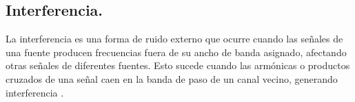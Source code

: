 \subsection*{\fontsize{12}{18}\selectfont Interferencia.}

\begin{justify}
    La interferencia es una forma de ruido externo que ocurre cuando las señales de una fuente producen frecuencias fuera de su ancho de banda asignado,
    afectando otras señales de diferentes fuentes. Esto sucede cuando las armónicas o productos cruzados de una señal caen en la banda de paso de un canal vecino,
    generando interferencia \parencite{tomasi2003sistemas}.
\end{justify}